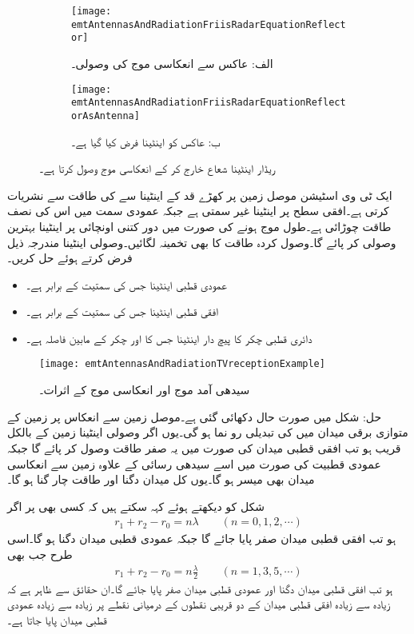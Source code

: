 \begin{figure}
\centering
\begin{subfigure}{0.4\textwidth}
\centering
\texttt{[image: emtAntennasAndRadiationFriisRadarEquationReflector]}
\caption*{الف: عاکس سے انعکاسی موج کی وصولی۔}
\end{subfigure}%
%
\begin{subfigure}{0.4\textwidth}
\centering
\texttt{[image: emtAntennasAndRadiationFriisRadarEquationReflectorAsAntenna]}
\caption*{ب: عاکس کو اینٹینا فرض کیا گیا ہے۔}
\end{subfigure}%
\caption{ریڈار اینٹینا شعاع خارج کر کے انعکاسی موج وصول کرتا ہے۔}
\label{شکل_اینٹینا_ریڈار_ب}
\end{figure}
ایک ٹی وی اسٹیشن موصل زمین پر کھڑے  قد کے اینٹینا سے  کی طاقت سے نشریات کرتی ہے۔افقی سطح پر اینٹینا غیر سمتی ہے جبکہ عمودی سمت میں اس کی نصف طاقت چوڑائی  ہے۔طول موج  ہونے کی صورت میں  دور کتنی اونچائی پر اینٹینا بہترین وصولی کر پائے گا۔وصول کردہ طاقت کا بھی تخمینہ لگائیں۔وصولی اینٹینا مندرجہ ذیل فرض کرتے ہوئے حل کریں۔
\begin{itemize}
\item
عمودی قطبی اینٹینا جس کی سمتیت  کے برابر ہے۔
\item
افقی قطبی اینٹینا جس کی سمتیت  کے برابر ہے۔
\item
دائری قطبی  چکر کا پیچ دار اینٹینا جس کا  اور چکر کے مابین فاصلہ  ہے۔
\end{itemize}

\begin{figure}
\centering
\texttt{[image: emtAntennasAndRadiationTVreceptionExample]}
\caption{سیدھی آمد موج اور انعکاسی موج کے اثرات۔}
\label{شکل_اینٹینا_سیدھی_آمد_انعکاسی_آمد}
\end{figure}


حل: شکل میں صورت حال دکھائی گئی ہے۔موصل زمین سے انعکاس پر زمین کے متوازی برقی میدان میں  کی تبدیلی رو نما ہو گی۔یوں اگر وصولی اینٹینا زمین کے بالکل قریب ہو تب افقی قطبی میدان کی صورت میں یہ صفر طاقت وصول کر پائے گا جبکہ عمودی قطبیت کی صورت میں اسے سیدھی رسائی کے علاوہ زمین سے انعکاسی میدان بھی میسر ہو گا۔یوں کل میدان دگنا اور طاقت چار گنا ہو گا۔

شکل  کو دیکھتے ہوئے کہہ سکتے ہیں کہ کسی بھی   پر اگر
\begin{align}
r_1+r_2-r_0=n\lambda \quad \quad (n=0,1,2,\cdots)
\end{align}
ہو تب افقی قطبی میدان صفر پایا جائے گا جبکہ عمودی قطبی میدان دگنا ہو گا۔اسی طرح جب بھی
\begin{align}
r_1+r_2-r_0=n \frac{\lambda}{2} \quad \quad (n=1,3,5,\cdots)
\end{align}
ہو تب افقی قطبی میدان دگنا اور عمودی قطبی میدان صفر پایا جائے گا۔ان حقائق سے ظاہر ہے کہ زیادہ سے زیادہ افقی قطبی میدان کے دو قریبی نقطوں کے درمیانی نقطے پر زیادہ سے زیادہ عمودی قطبی میدان پایا جاتا ہے۔

